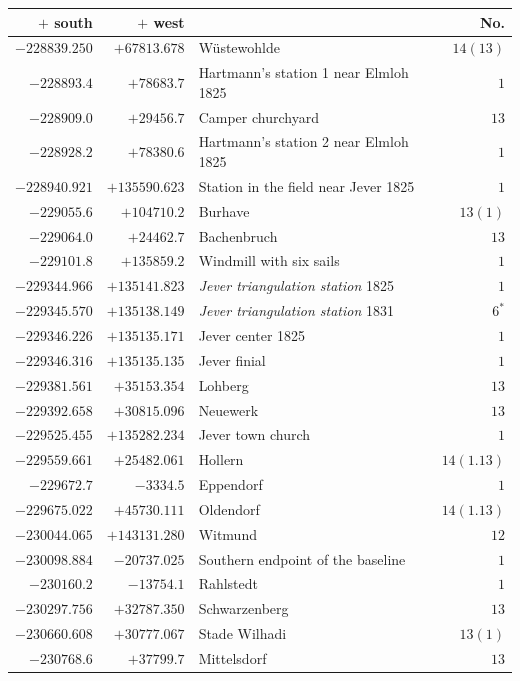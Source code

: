 \begin{center}\begingroup\fontsize{8}{9}\selectfont
\setlength{\tabcolsep}{4pt}
\begin{tabular}{r|r|p{170pt}|r}\hline
\(+\) south&\(+\) west&&No.\\\hline
\(-228839.250\)&\(+67813.678\)&Wüstewohlde&\(14(13)\)\\
\(-228893.4\)&\(+78683.7\)&Hartmann’s station 1 near Elmloh 1825&\(1\)\\
\(-228909.0\)&\(+29456.7\)&Camper churchyard&\(13\)\\
\(-228928.2\)&\(+78380.6\)&Hartmann’s station 2 near Elmloh 1825&\(1\)\\
\(-228940.921\)&\(+135590.623\)&Station in the field near Jever 1825&\(1\)\\
\(-229055.6\)&\(+104710.2\)&Burhave&\(13(1)\)\\
\(-229064.0\)&\(+24462.7\)&Bachenbruch&\(13\)\\
\(-229101.8\)&\(+135859.2\)&Windmill with six sails&\(1\)\\
\(-229344.966\)&\(+135141.823\)&\textit{Jever triangulation station} 1825&\(1\)\\
\(-229345.570\)&\(+135138.149\)&\textit{Jever triangulation station} 1831&\(6^{*}\)\\
\(-229346.226\)&\(+135135.171\)&Jever center 1825&\(1\)\\
\(-229346.316\)&\(+135135.135\)&Jever finial&\(1\)\\
\(-229381.561\)&\(+35153.354\)&Lohberg&\(13\)\\
\(-229392.658\)&\(+30815.096\)&Neuewerk&\(13\)\\
\(-229525.455\)&\(+135282.234\)&Jever town church&\(1\)\\
\(-229559.661\)&\(+25482.061\)&Hollern&\(14(1.13)\)\\
\(-229672.7\)&\(-3334.5\)&Eppendorf&\(1\)\\
\(-229675.022\)&\(+45730.111\)&Oldendorf&\(14(1.13)\)\\
\(-230044.065\)&\(+143131.280\)&Witmund&\(12\)\\
\(-230098.884\)&\(-20737.025\)&Southern endpoint of the baseline&\(1\)\\
\(-230160.2\)&\(-13754.1\)&Rahlstedt&\(1\)\\
\(-230297.756\)&\(+32787.350\)&Schwarzenberg&\(13\)\\
\(-230660.608\)&\(+30777.067\)&Stade Wilhadi&\(13(1)\)\\
\(-230768.6\)&\(+37799.7\)&Mittelsdorf&\(13\)\\

\end{tabular}
\end{center}
